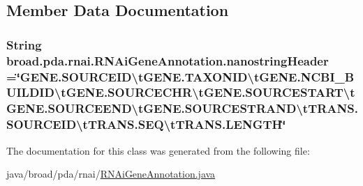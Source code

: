 \subsection{Member Data Documentation}
\hypertarget{classbroad_1_1pda_1_1rnai_1_1_r_n_ai_gene_annotation_a902a72d75f39bf3b00ba382af61ec0bd}{
\subsubsection[{nanostring\+Header}]{\setlength{\rightskip}{0pt plus 5cm}String broad.\+pda.\+rnai.\+R\+N\+Ai\+Gene\+Annotation.\+nanostring\+Header =\char`\"{}G\+E\+N\+E.\+S\+O\+U\+R\+C\+E\+I\+D\textbackslash{}t\+G\+E\+N\+E.\+T\+A\+X\+O\+N\+I\+D\textbackslash{}t\+G\+E\+N\+E.\+N\+C\+B\+I\+\_\+\+B\+U\+I\+L\+D\+I\+D\textbackslash{}t\+G\+E\+N\+E.\+S\+O\+U\+R\+C\+E\+C\+H\+R\textbackslash{}t\+G\+E\+N\+E.\+S\+O\+U\+R\+C\+E\+S\+T\+A\+R\+T\textbackslash{}t\+G\+E\+N\+E.\+S\+O\+U\+R\+C\+E\+E\+N\+D\textbackslash{}t\+G\+E\+N\+E.\+S\+O\+U\+R\+C\+E\+S\+T\+R\+A\+N\+D\textbackslash{}t\+T\+R\+A\+N\+S.\+S\+O\+U\+R\+C\+E\+I\+D\textbackslash{}t\+T\+R\+A\+N\+S.\+S\+E\+Q\textbackslash{}t\+T\+R\+A\+N\+S.\+L\+E\+N\+G\+T\+H\char`\"{}\hspace{0.3cm}{\ttfamily [static]}}}\label{classbroad_1_1pda_1_1rnai_1_1_r_n_ai_gene_annotation_a902a72d75f39bf3b00ba382af61ec0bd}


The documentation for this class was generated from the following file\+:\begin{DoxyCompactItemize}
\item 
java/broad/pda/rnai/\hyperlink{_r_n_ai_gene_annotation_8java}{R\+N\+Ai\+Gene\+Annotation.\+java}\end{DoxyCompactItemize}
